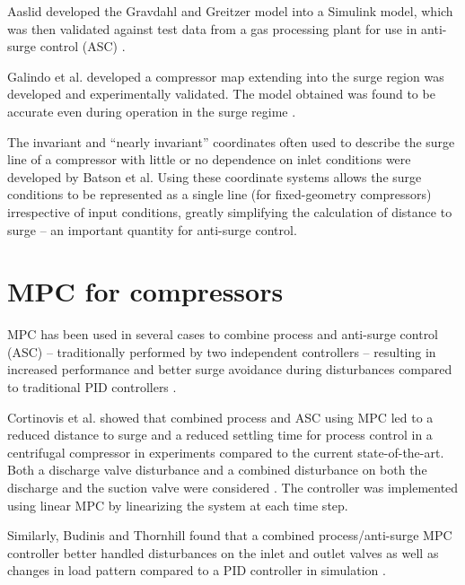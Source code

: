 Aaslid developed the Gravdahl and Greitzer model into a Simulink model, which was then validated against test data from a gas processing plant for use in anti-surge control (ASC) \cite{Aaslid2009}. 

Galindo et al. developed a compressor map extending into the surge region was developed and experimentally validated. The model obtained was found to be accurate even during operation in the surge regime \cite{Galindo2008}.

The invariant and ``nearly invariant'' coordinates often used to describe the surge line of a compressor with little or no dependence on inlet conditions were developed by Batson et al. \cite{Batson1996}
Using these coordinate systems allows the surge conditions to be represented as a single line (for fixed-geometry compressors) irrespective of input conditions, greatly simplifying the calculation of distance to surge -- an important quantity for anti-surge control.



\section{MPC for compressors}
MPC has been used in several cases to combine process and anti-surge control (ASC) -- traditionally performed by two independent controllers -- resulting in increased performance and better surge avoidance during disturbances compared to traditional PID controllers \cite{Cortinovis2015,Budinis2015}.

Cortinovis et al. showed that combined process and ASC using MPC led to a reduced distance to surge and a reduced settling time for process control in a centrifugal compressor in experiments compared to the current state-of-the-art. 
Both a discharge valve disturbance and a combined disturbance on both the discharge and the suction valve were considered \cite{Cortinovis2015}. 
The controller was implemented using linear MPC by linearizing the system at each time step. 

Similarly, Budinis and Thornhill found that a combined process/anti-surge MPC controller better handled disturbances on the inlet and outlet valves as well as changes in load pattern compared to a PID controller in simulation \cite{Budinis2015}.

